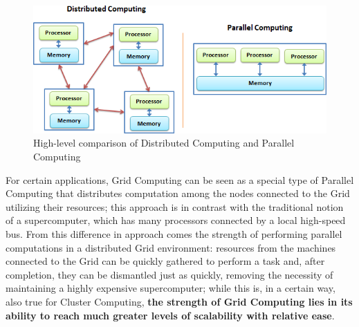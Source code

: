 \vspace{5mm}
\begin{figure}[!ht]
    \centering
    \includegraphics[width=\linewidth]{document/chapters/chapter_1/images/distributed_computing_vs_parallel_computing.png}
    \caption{High-level comparison of Distributed Computing and Parallel Computing \cite{distributed_vs_parallel}}
    \label{fig:distributed_vs_parallel}
\end{figure}
\vspace{2mm}

For certain applications, Grid Computing can be seen as a special type of Parallel Computing that distributes computation among the nodes connected to the Grid utilizing their resources; this approach is in contrast with the traditional notion of a supercomputer, which has many processors connected by a local high-speed bus.
From this difference in approach comes the strength of performing parallel computations in a distributed Grid environment: resources from the machines connected to the Grid can be quickly gathered to perform a task and, after completion, they can be dismantled just as quickly, removing the necessity of maintaining a highly expensive supercomputer; while this is, in a certain way, also true for Cluster Computing, \textbf{the strength of Grid Computing lies in its ability to reach much greater levels of scalability with relative ease}. 

